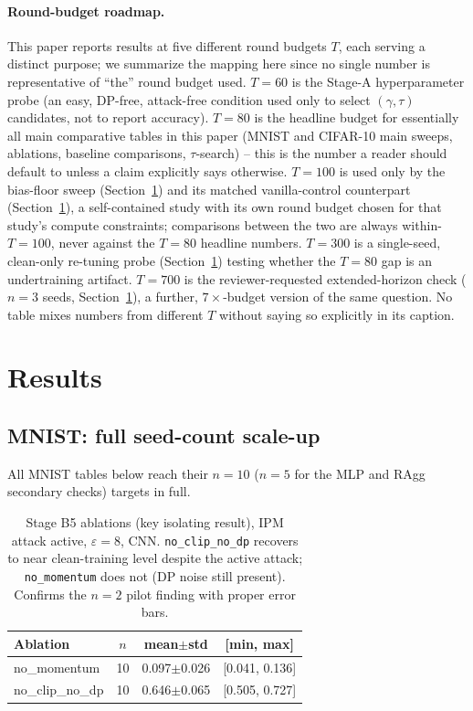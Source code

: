 \documentclass{article}
\begin{document}
\paragraph{Round-budget roadmap.} This paper reports results at five
different round budgets $T$, each serving a distinct purpose; we summarize
the mapping here since no single number is representative of ``the'' round
budget used. $T{=}60$ is the Stage-A hyperparameter probe (an easy, DP-free,
attack-free condition used only to select $(\gamma,\tau)$ candidates, not to
report accuracy). $T{=}80$ is the headline budget for essentially all main
comparative tables in this paper (MNIST and CIFAR-10 main sweeps, ablations,
baseline comparisons, $\tau$-search) -- this is the number a reader should
default to unless a claim explicitly says otherwise. $T{=}100$ is used only
by the bias-floor sweep (Section~\ref{sec:results}) and its matched
vanilla-control counterpart (Section~\ref{sec:results}), a self-contained
study with its own round budget chosen for that study's compute constraints;
comparisons between the two are always within-$T{=}100$, never against the
$T{=}80$ headline numbers. $T{=}300$ is a single-seed, clean-only re-tuning
probe (Section~\ref{sec:results}) testing whether the $T{=}80$ gap is an
undertraining artifact. $T{=}700$ is the reviewer-requested extended-horizon
check ($n{=}3$ seeds, Section~\ref{sec:results}), a further, $7\times$-budget
version of the same question. No table mixes numbers from different $T$
without saying so explicitly in its caption.

\section{Results}
\label{sec:results}

\subsection{MNIST: full seed-count scale-up}
\label{sec:mnist-results}
All MNIST tables below reach their $n{=}10$ ($n{=}5$ for the MLP and RAgg
secondary checks) targets in full.

\begin{table}[t]
\centering\small
\begin{tabular}{lccc}
\toprule
Ablation & $n$ & mean$\pm$std & [min, max] \\
\midrule
no\_momentum & 10 & 0.097$\pm$0.026 & [0.041, 0.136] \\
no\_clip\_no\_dp & 10 & 0.646$\pm$0.065 & [0.505, 0.727] \\
\bottomrule
\end{tabular}
\caption{Stage B5 ablations (key isolating result), IPM attack active,
$\varepsilon{=}8$, CNN. \texttt{no\_clip\_no\_dp} recovers to near
clean-training level despite the active attack; \texttt{no\_momentum} does
not (DP noise still present). Confirms the $n{=}2$ pilot finding with proper
error bars.}
\label{tab:mnist-b5}
\end{table}
\end{document}
